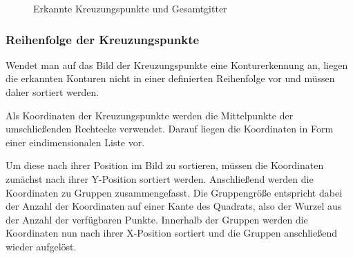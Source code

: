 \begin{figure}[H]
    \hfill
    \caption{Erkannte Kreuzungspunkte und Gesamtgitter}
\end{figure}


\subsubsection{Reihenfolge der Kreuzungspunkte}
Wendet man auf das Bild der Kreuzungspunkte eine Konturerkennung an, liegen die erkannten Konturen nicht in einer definierten Reihenfolge vor und müssen daher sortiert werden.

Als Koordinaten der Kreuzungspunkte werden die Mittelpunkte der umschließenden Rechtecke verwendet.
Darauf liegen die Koordinaten in Form einer eindimensionalen Liste vor.

Um diese nach ihrer Position im Bild zu sortieren, müssen die Koordinaten zunächst nach ihrer Y-Position sortiert werden.
Anschließend werden die Koordinaten zu Gruppen zusammengefasst.
Die Gruppengröße entspricht dabei der Anzahl der Koordinaten auf einer Kante des Quadrats, also der Wurzel aus der Anzahl der verfügbaren Punkte.
Innerhalb der Gruppen werden die Koordinaten nun nach ihrer X-Position sortiert und die Gruppen anschließend wieder aufgelöst.

